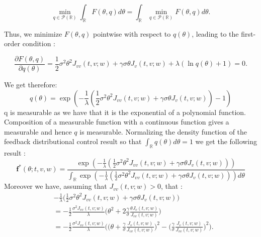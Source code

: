 \documentclass[oneside, a4paper, onecolumn, 11pt]{article}
\begin{document}
\begin{equation}
\min_{q \in \mathcal{P}(\mathbb{R})} \int_{\mathbb{R}} F(\theta, q) d\theta = \int_{\mathbb{R}} \min_{q \in \mathcal{P}(\mathbb{R})} F(\theta, q) d\theta.
\end{equation}

Thus, we minimize \( F(\theta, q) \) pointwise with respect to \( q(\theta) \), leading to the first-order condition :

\begin{equation}
\frac{\partial F(\theta, q)}{\partial q(\theta)} = \frac{1}{2} \sigma^2 \theta^2 J_{vv}(t, v; w) + \gamma \sigma \theta J_v(t, v; w) + \lambda (\ln q(\theta) + 1) = 0.
\end{equation}

We get therefore: 
\begin{equation*}
    q(\theta) = \exp\left(-\frac{1}{\lambda} \left( \frac{1}{2} \sigma^2 \theta^2 J_{vv}(t,v; w)  + \gamma \sigma \theta J_v(t,v; w)   \right) -1 \right)
\end{equation*}
q is measurable as we have that it is the exponential of a polynomial function. Composition of a measurable function with a continuous function gives a measurable and hence $q$ is measurable. 
Normalizing the density function of the feedback distributional control result so that $\int_{\mathbb{R}} q(\theta) d\theta = 1 $  we get the following result : 
\begin{equation}
    \boldsymbol{f}^* (\theta; t, v, w) = \frac{ \exp\left(-\frac{1}{\lambda} \left( \frac{1}{2} \sigma^2 \theta^2 J_{vv}(t,v; w)  + \gamma \sigma \theta J_v(t,v; w)   \right) \right)}{ \int_{\mathbb{R}} \exp\left(-\frac{1}{\lambda} \left( \frac{1}{2} \sigma^2 \theta^2 J_{vv}(t,v; w)  + \gamma \sigma \theta J_v(t,v; w) \right)\right) d\theta}    
\end{equation}
Moreover we have, assuming that $J_{vv}(t,v; w) > 0 $, that  :
\begin{align*}
    &-\frac{1}{\lambda} \bigg( \frac{1}{2} \sigma^2 \theta^2 J_{vv}(t,v; w) 
    + \gamma \sigma \theta J_v(t,v; w) \bigg) \\
    &= -\frac{1}{2} \frac{\sigma^2 J_{vv}(t,v;w)}{\lambda} 
    \bigg( \theta^2 + 2 \frac{\gamma}{\sigma} \frac{\theta J_v(t,v; w)}{J_{vv}(t,v;w)} \bigg) \\
    &= -\frac{1}{2} \frac{\sigma^2 J_{vv}(t,v;w)}{\lambda} 
    \bigg( \Big( \theta + \frac{\gamma}{\sigma} \frac{J_v(t,v; w)}{J_{vv}(t,v;w)} \Big)^2  - \Big( \frac{\gamma}{\sigma} \frac{J_v(t,v; w)}{J_{vv}(t,v;w)} \Big)^2 \bigg).
\end{align*}
\end{document}

